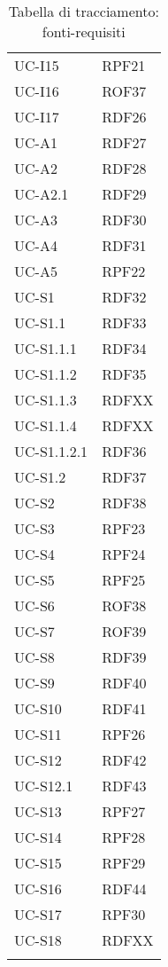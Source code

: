 \begin{longtable}{| p{5cm} | p{5cm} |}
		\rowcolor{LightGray}
		UC-I15 & RPF21 \\
		UC-I16 & ROF37 \\
		\rowcolor{LightGray}
		UC-I17 & RDF26\\		
		UC-A1 & RDF27\\
		\rowcolor{LightGray}
		UC-A2 & RDF28 \\
		UC-A2.1 & RDF29 \\
		\rowcolor{LightGray}
		UC-A3 & RDF30\\
		UC-A4 & RDF31 \\
		\rowcolor{LightGray}
		UC-A5 & RPF22\\
		UC-S1 & RDF32 \\
		\rowcolor{LightGray}
		UC-S1.1 & RDF33\\
		UC-S1.1.1 & RDF34\\
		\rowcolor{LightGray}
		UC-S1.1.2 & RDF35\\
		UC-S1.1.3 & RDFXX\\%
		\rowcolor{LightGray}
		UC-S1.1.4 & RDFXX\\%
		UC-S1.1.2.1 & RDF36\\
		\rowcolor{LightGray}
		UC-S1.2 & RDF37\\
		UC-S2 & RDF38\\
		\rowcolor{LightGray}
		UC-S3 & RPF23\\
		UC-S4 & RPF24\\
		\rowcolor{LightGray}
		UC-S5 & RPF25 \\
		UC-S6 & ROF38 \\
		\rowcolor{LightGray}
		UC-S7 & ROF39 \\
		UC-S8 & RDF39 \\
		\rowcolor{LightGray}
		UC-S9 & RDF40 \\
		UC-S10 & RDF41\\
		\rowcolor{LightGray}
		UC-S11 & RPF26 \\
		UC-S12 & RDF42 \\
		\rowcolor{LightGray}
		UC-S12.1 & RDF43 \\
		UC-S13 & RPF27 \\
		\rowcolor{LightGray}
		UC-S14 & RPF28 \\
		UC-S15 & RPF29 \\
		\rowcolor{LightGray} 
		UC-S16 & RDF44\\
		UC-S17 & RPF30\\
		\rowcolor{LightGray}		
		UC-S18 & RDFXX\\%
		\hline
		\caption{Tabella di tracciamento: fonti-requisiti}
\end{longtable}
